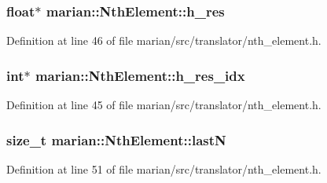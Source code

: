 \subsubsection[{\texorpdfstring{h\+\_\+res}{h_res}}]{\setlength{\rightskip}{0pt plus 5cm}float$\ast$ marian\+::\+Nth\+Element\+::h\+\_\+res\hspace{0.3cm}{\ttfamily [private]}}\hypertarget{classmarian_1_1NthElement_ae1dbf516946343df761ebabd1185bf60}{}\label{classmarian_1_1NthElement_ae1dbf516946343df761ebabd1185bf60}


Definition at line 46 of file marian/src/translator/nth\+\_\+element.\+h.

\subsubsection[{\texorpdfstring{h\+\_\+res\+\_\+idx}{h_res_idx}}]{\setlength{\rightskip}{0pt plus 5cm}int$\ast$ marian\+::\+Nth\+Element\+::h\+\_\+res\+\_\+idx\hspace{0.3cm}{\ttfamily [private]}}\hypertarget{classmarian_1_1NthElement_acb9fa9a306f3e380e7832f8e8206fa31}{}\label{classmarian_1_1NthElement_acb9fa9a306f3e380e7832f8e8206fa31}


Definition at line 45 of file marian/src/translator/nth\+\_\+element.\+h.

\subsubsection[{\texorpdfstring{lastN}{lastN}}]{\setlength{\rightskip}{0pt plus 5cm}size\+\_\+t marian\+::\+Nth\+Element\+::lastN\hspace{0.3cm}{\ttfamily [private]}}\hypertarget{classmarian_1_1NthElement_a6a57bd79e06383c8e1a078d4acf76b8f}{}\label{classmarian_1_1NthElement_a6a57bd79e06383c8e1a078d4acf76b8f}


Definition at line 51 of file marian/src/translator/nth\+\_\+element.\+h.

